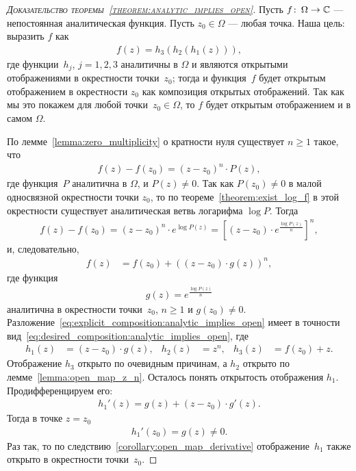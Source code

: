 \documentclass[../complex-analysis.tex]{subfiles}
\begin{document}
  \begin{proof}[\normalfont\textsc{Доказательство теоремы~\ref{theorem:analytic_implies_open}}]
   Пусть $ f \colon\,\Omega\to\mathbb{C} $ --- непостоянная аналитическая функция. Пусть $ z_0 \in \Omega $ --- любая точка. Наша цель: выразить $ f $ как
   \begin{align}
    \label{eq:desired_composition:analytic_implies_open}
    f(z) = h_3(h_2(h_1(z))),
   \end{align} где функции~$ h_j $, $ j=1,2,3 $ аналитичны в $ \Omega $ и являются открытыми отображениями в окрестности точки~$ z_0 $; тогда и функция~$ f $ будет открытым отображением в окрестности $ z_0 $ как композиция открытых отображений. Так как мы это покажем для любой точки~$ z_0\in\Omega $, то $ f $ будет открытым отображением и в самом $ \Omega $.

   По лемме~\ref{lemma:zero_multiplicity} о кратности нуля существует $ n \geqslant 1 $ такое, что
   \begin{align*}
    f(z) - f(z_0) = (z - z_0)^{n} \cdot P(z),
   \end{align*} где функция~$ P $ аналитична в $ \Omega $, и $ P(z) \neq 0 $. Так как $ P(z_0) \neq 0 $ в малой односвязной окрестности точки $ z_0 $, то по теореме~\ref{theorem:exist_log_f} в этой окрестности существует аналитическая ветвь логарифма $ \log P $. Тогда
   \begin{align*}
    f(z) - f(z_0) = (z - z_0)^{n} \cdot e^{\log P(z)} = \left[ \left( z-z_0 \right) \cdot e^{\frac{\log P(z)}{n}} \right]^{n},
   \end{align*} и, следовательно,
   \begin{align}
    \label{eq:explicit_composition:analytic_implies_open}
    f(z) &= f(z_0) + ((z-z_0) \cdot g(z))^{n},
   \end{align} где функция
   \begin{align*}
    g(z) = e^{\frac{\log P(z)}{n}}
   \end{align*} аналитична в окрестности точки~$ z_0 $, $ n \geqslant 1 $ и $ g(z_0) \neq 0 $. Разложение~\eqref{eq:explicit_composition:analytic_implies_open} имеет в точности вид~\eqref{eq:desired_composition:analytic_implies_open}, где
   \begin{align*}
    h_1(z) &= (z - z_0) \cdot g(z), & h_2(z) &= z^{n}, & h_3(z) &= f(z_0) + z.
   \end{align*} Отображение $ h_3 $ открыто по очевидным причинам, а $ h_2 $ открыто по лемме~\ref{lemma:open_map_z_n}. Осталось понять открытость отображения $ h_1 $. Продифференцируем его:
   \begin{align*}
    h_1'(z) = g(z) + (z - z_0) \cdot g'(z).
   \end{align*} Тогда в точке $ z = z_0 $
   \begin{align*}
    h_1'(z_0) = g(z) \neq 0.
   \end{align*} Раз так, то по следствию~\ref{corollary:open_map_derivative} отображение~$ h_1 $ также открыто в окрестности точки~$ z_0 $.
  \end{proof}
\end{document}
